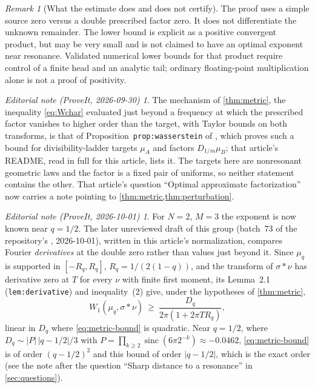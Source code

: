 \documentclass[11pt,letterpaper]{article}
\theoremstyle{definition}
\theoremstyle{remark}
\newtheorem{remark}[theorem]{Remark}
\newtheorem*{ednote}{Editorial note (ProveIt, 2026-09-30)}
\newtheorem*{ednotelater}{Editorial note (ProveIt, 2026-10-01)}
\newcommand{\sinc}{\operatorname{sinc}}
\numberwithin{equation}{section}
\begin{document}
\begin{remark}[What the estimate does and does not certify]
The proof uses a simple source zero versus a double prescribed factor zero. It does not differentiate the unknown remainder. The lower bound is explicit as a positive convergent product, but may be very small and is not claimed to have an optimal exponent near resonance. Validated numerical lower bounds for that product require control of a finite head and an analytic tail; ordinary floating-point multiplication alone is not a proof of positivity.
\end{remark}
\begin{ednote}
The mechanism of \cref{thm:metric}, the inequality \eqref{eq:Wchar}
evaluated just beyond a frequency at which the prescribed factor vanishes
to higher order than the target, with Taylor bounds on both transforms, is
that of Proposition~\texttt{prop:wasserstein} of
, which proves
such a bound for divisibility-ladder targets $\mu_A$ and factors
$D_{1/m}\mu_B$; that article's README, read in full for this article,
lists it. The targets here are nonresonant geometric laws and the factor
is a fixed pair of uniforms, so neither statement contains the other. That
article's question ``Optimal approximate factorization'' now carries a note
pointing to \cref{thm:metric,thm:perturbation}.
\end{ednote}
\begin{ednotelater}
For $N=2$, $M=3$ the exponent is now known near $q=1/2$. The later
unreviewed draft
of this group (batch~73 of the repository's ,
2026-10-01), written in this article's normalization, compares Fourier
\emph{derivatives} at the double zero rather than values just beyond it.
Since $\mu_q$ is supported in $[-R_q,R_q]$, $R_q=1/(2(1-q))$, and the
transform of $\sigma*\nu$ has derivative zero at $T$ for every $\nu$ with
finite first moment, its Lemma~2.1 (\texttt{lem:derivative}) and
inequality~(2) give, under the hypotheses of \cref{thm:metric},
\[
 W_1(\mu_q,\sigma*\nu)\ \ge\ \frac{D_q}{2\pi(1+2\pi TR_q)},
\]
linear in $D_q$ where \eqref{eq:metric-bound} is quadratic. Near $q=1/2$,
where $D_q\sim|P|\,|q-1/2|/3$ with $P=\prod_{k\ge2}\sinc(6\pi2^{-k})\approx-0.0462$,
\eqref{eq:metric-bound} is of order $(q-1/2)^2$ and this bound of order
$|q-1/2|$, which is the exact order (see the note after the question
``Sharp distance to a resonance'' in \cref{sec:questions}).
\end{ednotelater}
\end{document}
